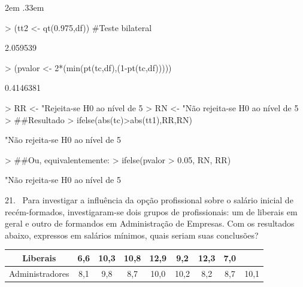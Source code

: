 \documentclass{article}
\newenvironment{ManualExercise}
  {\begin{list}{}{\leftmargin \QuestionIndent
    \partopsep0pt \parsep\parskip \topsep\QuestionBefore
    \itemsep\QuestionBefore \labelwidth2em
    \labelsep.33em
    \usecounter{Question}}}
  {\end{list}}
\begin{document}
\begin{Exercise}
\begin{ManualExercise}
\begin{Schunk}
\begin{Sinput}
> (tt2 <- qt(0.975,df)) #Teste bilateral
\end{Sinput}
\begin{Soutput}
[1] 2.059539
\end{Soutput}
\begin{Sinput}
> (pvalor <- 2*(min(pt(tc,df),(1-pt(tc,df)))))
\end{Sinput}
\begin{Soutput}
[1] 0.4146381
\end{Soutput}
\begin{Sinput}
> RR <- "Rejeita-se H0 ao nível de 5%
> RN <- "Não rejeita-se H0 ao nível de 5%
> ##Resultado
> ifelse(abs(tc)>abs(tt1),RR,RN)
\end{Sinput}
\begin{Soutput}
[1] "Não rejeita-se H0 ao nível de 5%
\end{Soutput}
\begin{Sinput}
> ##Ou, equivalentemente:
> ifelse(pvalor > 0.05, RN, RR)
\end{Sinput}
\begin{Soutput}
[1] "Não rejeita-se H0 ao nível de 5%
\end{Soutput}
\end{Schunk}

\item[21.~]Para investigar a influência da opção profissional sobre o salário inicial de recém-formados, investigaram-se dois grupos de profissionais: um de liberais em geral 
e outro de formandos em Administração de Empresas. Com os resultados abaixo, expressos em salários mínimos, quais seriam suas conclusões?

\begin{tabular}{ccccccccc}\\ \hline
Liberais & 6,6 & 10,3 & 10,8 & 12,9 & 9,2 & 12,3 & 7,0 &  \\ \hline
Administradores & 8,1 & 9,8 & 8,7 & 10,0 & 10,2 & 8,2 & 8,7 & 10,1 \\ \hline
\end{tabular}


\end{ManualExercise}
\end{Exercise}
\end{document}
